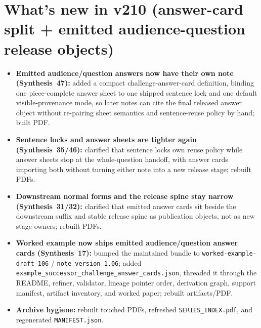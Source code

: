 \documentclass[11pt]{article}
\begin{document}
\section{What's new in v210 (answer-card split + emitted audience-question release objects)}
\begin{itemize}[leftmargin=*]
\item \textbf{Emitted audience/question answers now have their own note (Synthesis~47):} added a compact challenge-answer-card definition, binding one piece-complete answer sheet to one shipped sentence lock and one default visible-provenance mode, so later notes can cite the final released answer object without re-pairing sheet semantics and sentence-reuse policy by hand; built PDF.
\item \textbf{Sentence locks and answer sheets are tighter again (Synthesis~35/46):} clarified that sentence locks own reuse policy while answer sheets stop at the whole-question handoff, with answer cards importing both without turning either note into a new release stage; rebuilt PDFs.
\item \textbf{Downstream normal forms and the release spine stay narrow (Synthesis~31/32):} clarified that emitted answer cards sit beside the downstream suffix and stable release spine as publication objects, not as new stage owners; rebuilt PDFs.
\item \textbf{Worked example now ships emitted audience/question answer cards (Synthesis~17):} bumped the maintained bundle to \texttt{worked-example-draft-106} / \texttt{note\_version 1.06}; added \texttt{example\_successor\_challenge\_answer\_cards.json}, threaded it through the README, refiner, validator, lineage pointer order, derivation graph, support manifest, artifact inventory, and worked paper; rebuilt artifacts/PDF.
\item \textbf{Archive hygiene:} rebuilt touched PDFs, refreshed \texttt{SERIES\_INDEX.pdf}, and regenerated \texttt{MANIFEST.json}.
\end{itemize}
\end{document}

